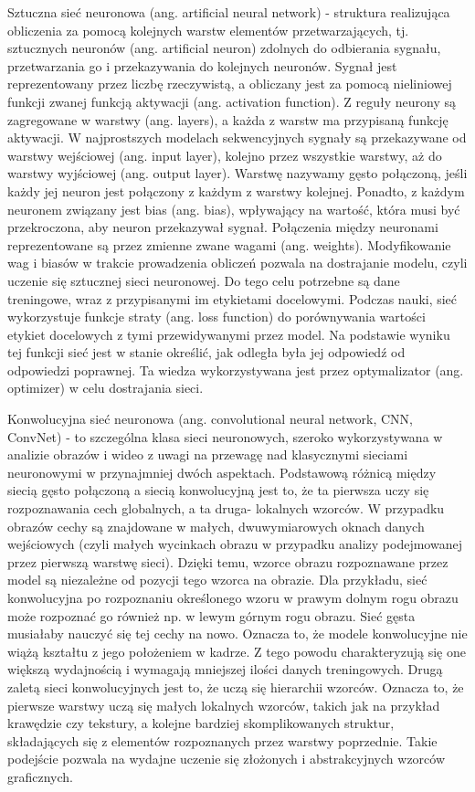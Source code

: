 Sztuczna sieć neuronowa (ang. artificial neural network) - struktura realizująca obliczenia za pomocą kolejnych warstw elementów przetwarzających, tj. sztucznych neuronów (ang. artificial neuron) zdolnych do odbierania sygnału, przetwarzania go i przekazywania do kolejnych neuronów. Sygnał jest reprezentowany przez liczbę rzeczywistą, a obliczany jest za pomocą nieliniowej funkcji zwanej funkcją aktywacji (ang. activation function). Z reguły neurony są zagregowane w warstwy (ang. layers), a każda z warstw ma przypisaną funkcję aktywacji. W najprostszych modelach sekwencyjnych sygnały są przekazywane od warstwy wejściowej (ang. input layer), kolejno przez wszystkie warstwy, aż do warstwy wyjściowej (ang. output layer). Warstwę nazywamy gęsto połączoną, jeśli każdy jej neuron jest połączony z każdym z warstwy kolejnej. Ponadto, z każdym neuronem związany jest bias (ang. bias), wpływający na wartość, która musi być przekroczona, aby neuron przekazywał sygnał. Połączenia między neuronami reprezentowane są przez zmienne zwane wagami (ang. weights). Modyfikowanie wag i biasów w trakcie prowadzenia obliczeń pozwala na dostrajanie modelu, czyli uczenie się sztucznej sieci neuronowej. Do tego celu potrzebne są dane treningowe, wraz z przypisanymi im etykietami docelowymi. Podczas nauki, sieć wykorzystuje funkcje straty (ang. loss function) do porównywania wartości etykiet docelowych z tymi przewidywanymi przez model. Na podstawie wyniku tej funkcji sieć jest w stanie określić, jak odległa była jej odpowiedź od odpowiedzi poprawnej. Ta wiedza wykorzystywana jest przez optymalizator (ang. optimizer) w celu dostrajania sieci.

Konwolucyjna sieć neuronowa (ang. convolutional neural network, CNN, ConvNet) - to szczególna klasa sieci neuronowych, szeroko wykorzystywana w analizie obrazów i wideo z uwagi na przewagę nad klasycznymi sieciami neuronowymi w przynajmniej dwóch aspektach. Podstawową różnicą między siecią gęsto połączoną a siecią konwolucyjną jest to, że ta pierwsza uczy się rozpoznawania cech globalnych, a ta druga- lokalnych wzorców. W przypadku obrazów cechy są znajdowane w małych, dwuwymiarowych oknach danych wejściowych (czyli małych wycinkach obrazu w przypadku analizy podejmowanej przez pierwszą warstwę sieci). Dzięki temu, wzorce obrazu rozpoznawane przez model są niezależne od pozycji tego wzorca na obrazie. Dla przykładu, sieć konwolucyjna po rozpoznaniu określonego wzoru w prawym dolnym rogu obrazu może rozpoznać go również np. w lewym górnym rogu obrazu. Sieć gęsta musiałaby nauczyć się tej cechy na nowo. Oznacza to, że modele konwolucyjne nie wiążą kształtu z jego położeniem w kadrze. Z tego powodu charakteryzują się one większą wydajnością i wymagają mniejszej ilości danych treningowych. Drugą zaletą sieci konwolucyjnych jest to, że uczą się hierarchii wzorców. Oznacza to, że pierwsze warstwy uczą się małych lokalnych wzorców, takich jak na przykład krawędzie czy tekstury, a kolejne bardziej skomplikowanych struktur, składających się z elementów rozpoznanych przez warstwy poprzednie. Takie podejście pozwala na wydajne uczenie się złożonych i abstrakcyjnych wzorców graficznych.


